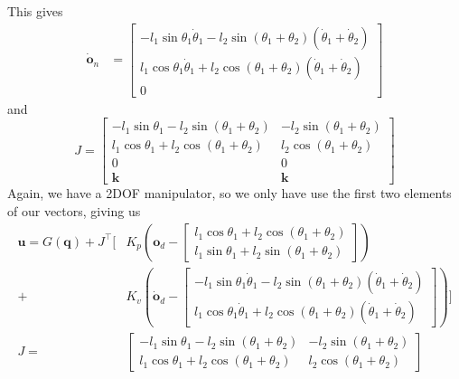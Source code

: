 \documentclass[a4paper]{scrartcl}
\begin{document}
This gives
\begin{equation}
	\begin{aligned}
		\dot{\bm{o}}_n &= \begin{bmatrix}
			-l_1 \sin\theta_1\dot{\theta}_1 - l_2\sin(\theta_1 + \theta_2)(\dot{\theta}_1 + \dot{\theta}_2) \\
			l_1 \cos\theta_1\dot{\theta}_1 + l_2\cos(\theta_1 + \theta_2)(\dot{\theta}_1 + \dot{\theta}_2) \\
			0
		\end{bmatrix}
	\end{aligned}
\end{equation}
and
\begin{equation}
	J = \begin{bmatrix}
			-l_1\sin\theta_1 - l_2\sin(\theta_1 + \theta_2) & - l_2\sin(\theta_1 + \theta_2)\\
			l_1\cos\theta_1 + l_2\cos(\theta_1 + \theta_2) & l_2\cos(\theta_1 + \theta_2)\\
			0 & 0\\
			\bm{k} & \bm{k}
		\end{bmatrix}
\end{equation}
Again, we have a 2DOF manipulator, so we only have use the first two elements of our vectors, giving us
\begin{equation}
	\begin{aligned}
		\bm{u} = G(\bm{q}) + J^\top \Bigg[ &K_p\left(\bm{o}_d - \begin{bmatrix}l_1 \cos\theta_1 + l_2 \cos(\theta_1 + \theta_2)\\l_1 \sin\theta_1 + l_2 \sin(\theta_1+\theta_2) \end{bmatrix}\right) \\
		+ &K_v\left(\dot{\bm{o}}_d - \begin{bmatrix} -l_1 \sin\theta_1\dot{\theta}_1 - l_2\sin(\theta_1 + \theta_2)(\dot{\theta}_1 + \dot{\theta}_2) \\
			l_1 \cos\theta_1\dot{\theta}_1 + l_2\cos(\theta_1 + \theta_2)(\dot{\theta}_1 + \dot{\theta}_2)\end{bmatrix} \right) \Bigg]\\
		J = &\begin{bmatrix}
			-l_1\sin\theta_1 - l_2\sin(\theta_1 + \theta_2) & - l_2\sin(\theta_1 + \theta_2)\\
			l_1\cos\theta_1 + l_2\cos(\theta_1 + \theta_2) & l_2\cos(\theta_1 + \theta_2)
		\end{bmatrix}
	\end{aligned}
\end{equation}
\end{document}

